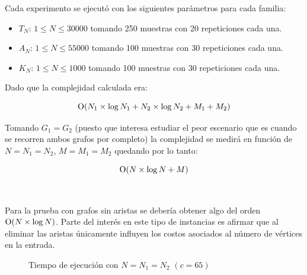 Cada experimento se ejecutó con los siguientes parámetros para cada familia:

\begin{itemize}
	\item $T_N$: $1 \leq N \leq  30000$ tomando 250 muestras con 20 repeticiones cada una.
	\item $A_N$: $1 \leq N \leq  55000$ tomando 100 muestras con 30 repeticiones cada una.
	\item $K_N$: $1 \leq N \leq  1000$ tomando 100 muestras con 30 repeticiones cada una.
\end{itemize}

Dado que la complejidad calculada era:

\begin{equation*}
	\operatorname{O}(N_1 \times \log N_1 + N_2 \times \log N_2 + M_1 + M_2)
\end{equation*}

Tomando $G_1 = G_2$ (puesto que interesa estudiar el peor escenario que es
cuando se recorren ambos grafos por completo) la complejidad se medirá en función
de $N = N_1 = N_2$, $M = M_1 = M_2$ quedando por lo tanto:

\begin{equation*}
	\operatorname{O}(N \times \log N + M)
\end{equation*}

~

Para la prueba con grafos sin aristas se debería obtener algo del orden $\operatorname{O}(N
\times \log N)$. Parte del interés en este tipo de instancias es afirmar que al
eliminar las aristas únicamente influyen los costos asociados al número de
vértices en la entrada.

\renewcommand\constante{65}

\begin{figure}[H]
	\centering
	\caption{Tiempo de ejecución con $N = N_1 = N_2$ $(c = \constante)$}
	\label{fig:heuristica-golosa:grafos-sin-aristas}
\end{figure}

